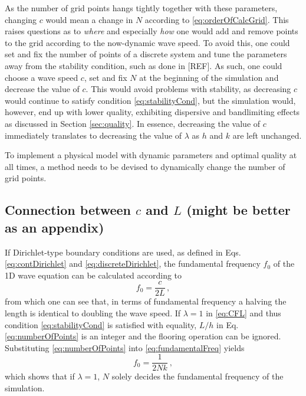 \documentclass[dvipsnames, preprint]{JASA}
\def\SWcomment[#1]{\textcolor{Bittersweet}{#1}}
\begin{document}
As the number of grid points hangs tightly together with these parameters, changing $c$ would mean a change in $N$ according to \eqref{eq:orderOfCalcGrid}. This raises questions as to \textit{where} and especially \textit{how} one would add and remove points to the grid according to the now-dynamic wave speed. To avoid this, one could set and fix the number of points of a discrete system and tune the parameters away from the stability condition, such as done in [REF]. As such, one could choose a wave speed $c$, set and fix $N$ at the beginning of the simulation and decrease the value of $c$. This would avoid problems with stability, as decreasing $c$ would continue to satisfy condition \eqref{eq:stabilityCond}, but the simulation would, however, end up with lower quality, exhibiting dispersive and bandlimiting effects as discussed in Section \ref{sec:quality}. In essence, decreasing the value of $c$ immediately translates to decreasing the value of $\lambda$ as $h$ and $k$ are left unchanged.

To implement a physical model with dynamic parameters and optimal quality at all times, a method needs to be devised to dynamically change the number of grid points.



\subsection{Connection between $c$ and $L$ \SWcomment[(might be better as an appendix)]}
If Dirichlet-type boundary conditions are used, as defined in Eqs. \eqref{eq:contDirichlet} and \eqref{eq:discreteDirichlet}, the fundamental frequency $f_0$ of the 1D wave equation can be calculated according to
\begin{equation}\label{eq:fundamentalFreq}
    f_0 = \frac{c}{2L}\,,
\end{equation}
from which one can see that, in terms of fundamental frequency a halving the length is identical to doubling the wave speed. 
If $\lambda = 1$ in \eqref{eq:CFL} and thus condition \eqref{eq:stabilityCond} is satisfied with equality, $L/h$ in Eq. \eqref{eq:numberOfPoints} is an integer and the flooring operation can be ignored. Substituting \eqref{eq:numberOfPoints} into \eqref{eq:fundamentalFreq} yields
\begin{equation}
    f_0 = \frac{1}{2Nk}\ ,
\end{equation}
which shows that if $\lambda = 1$, $N$ solely decides the fundamental frequency of the simulation.
\end{document}
